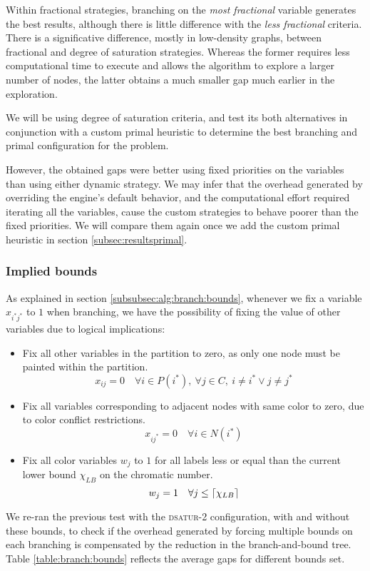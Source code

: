 Within fractional strategies, branching on the \textit{most fractional} variable generates the best results, although there is little difference with the \textit{less fractional} criteria. There is a significative difference, mostly in low-density graphs, between fractional and degree of saturation strategies. Whereas the former requires less computational time to execute and allows the algorithm to explore a larger number of nodes, the latter obtains a much smaller gap much earlier in the exploration.

We will be using degree of saturation criteria, and test its both alternatives in conjunction with a custom primal heuristic to determine the best branching and primal configuration for the problem.

However, the obtained gaps were better using fixed priorities on the variables than using either dynamic strategy. We may infer that the overhead generated by overriding the engine's default behavior, and the computational effort required iterating all the variables, cause the custom strategies to behave poorer than the fixed priorities. We will compare them again once we add the custom primal heuristic in section \ref{subsec:resultsprimal}.

\subsubsection{Implied bounds}

As explained in section \ref{subsubsec:alg:branch:bounds}, whenever we fix a variable $x_{i^*j^*}$ to $1$ when branching, we have the possibility of fixing the value of other variables due to logical implications:
\begin{itemize}
\item Fix all other variables in the partition to zero, as only one node must be painted within the partition.
\[
x_{ij} = 0 \quad \forall i \in P(i^*),\ \forall j \in C,\ i \neq i^* \vee j \neq j^*
\]
\item Fix all variables corresponding to adjacent nodes with same color to zero, due to color conflict restrictions.
\[
x_{ij^*} = 0 \quad \forall i \in N(i^*)
\]
\item Fix all color variables $w_j$ to $1$ for all labels less or equal than the current lower bound $\chi_{LB}$ on the chromatic number.
\[
w_j = 1 \quad \forall j \leq \left\lceil \chi_{LB} \right\rceil
\] 
\end{itemize}

We re-ran the previous test with the \textsc{dsatur-2} configuration, with and without these bounds, to check if the overhead generated by forcing multiple bounds on each branching is compensated by the reduction in the branch-and-bound tree. Table \ref{table:branch:bounds} reflects the average gaps for different bounds set.

